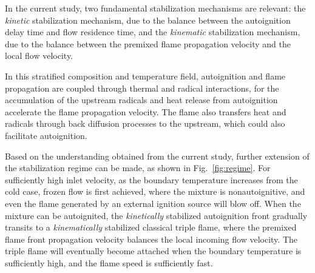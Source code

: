 \documentclass[twocolumn,10pt]{hphrc}
\begin{document}
In the current study, two fundamental stabilization mechanisms are relevant: the \emph {kinetic} stabilization mechanism, due to the balance between the autoignition delay time and flow residence time, and the \emph {kinematic} stabilization mechanism, due to the balance between the premixed flame propagation velocity and the local flow velocity. 

In this stratified composition and temperature field, autoignition and flame propagation are coupled through thermal and radical interactions, for the accumulation of the upstream radicals and heat release from autoignition accelerate the flame propagation velocity.  The flame also transfers heat and radicals through back diffusion processes to the upstream, which could also facilitate autoignition.

Based on the understanding obtained from the current study, further extension of the stabilization regime can be made, as shown in Fig.~\ref{fig:regime}.  For sufficiently high inlet velocity, as the boundary temperature increases from the cold case, frozen flow is first achieved, where the mixture is nonautoignitive, and even the flame generated by an external ignition source will blow off.  When the mixture can be autoignited, the \emph {kinetically} stabilized autoignition front gradually transits to a \emph {kinematically} stabilized classical triple flame, where the premixed flame front propagation velocity balances the local incoming flow velocity.  The triple flame will eventually become attached when the boundary temperature is sufficiently high, and the flame speed is sufficiently fast.


\end{document}
